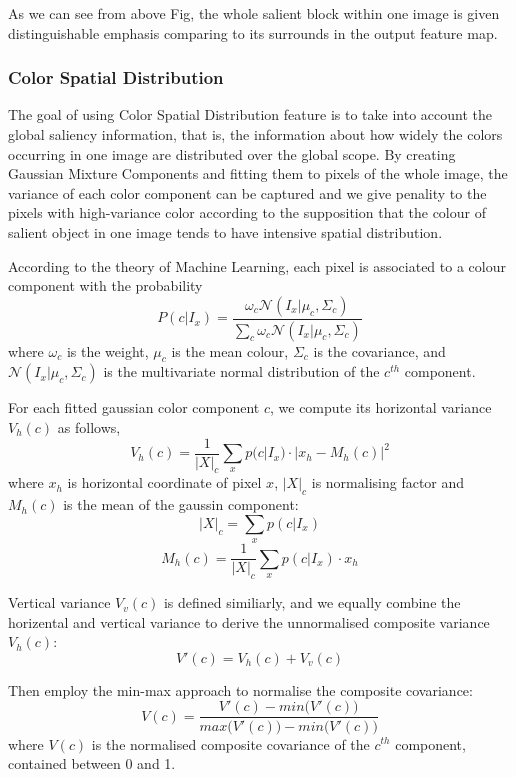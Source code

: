 \documentclass[10pt,twocolumn,letterpaper]{article}
\newcommand{\SUM}{\sum\limits}
\begin{document}
    As we can see from above Fig, the whole salient block within one image is given distinguishable 
    emphasis comparing to its surrounds in the output feature map. 



\subsubsection{Color Spatial Distribution}
    The goal of using Color Spatial Distribution feature is to take into account the global saliency information, 
    that is, the information about how widely the colors occurring in one image are distributed over the global scope.
    By creating Gaussian Mixture Components and fitting them to pixels of the whole image, the
    variance of each color component can be captured and we give penality to the pixels with high-variance 
    color according to the supposition that the colour of salient object in one image tends to have 
    intensive spatial distribution.
    
    According to the theory of Machine Learning, each pixel is associated to a colour component with the probability
    $$
    P(c|I_x) = \frac{\omega_c\mathcal{N}(I_x|\mu_c,\Sigma_c)}{\SUM_c \omega_c \mathcal{N}(I_x|\mu_c,\Sigma_c)}
    $$
    where $\omega_c$ is the weight, $\mu_c$ is the mean colour, $\Sigma_c$ is the covariance, and $\mathcal N(I_x|\mu_c,\Sigma_c)$ is the multivariate normal distribution of the $c^{th}$ component.

    For each fitted gaussian color component $c$, we compute its horizontal variance $V_{h}(c)$ as follows,
    $$
    V_{h}(c) = \frac{1}{|X|_{c}} \sum_{x} p (c|I_{x}) \cdot | x_{h} - M_{h}(c) |^{2}
    $$
    where $x_h$ is horizontal coordinate of pixel $x$, $|X|_c$ is normalising factor 
    and $M_h (c)$ is the mean of the gaussin component:
    $$
    |X|_c = \sum_x p(c|I_x)
    $$
    $$
    M_h (c) = \frac{1}{|X|_c} \sum_{x} p(c|I_x) \cdot x_h
    $$

    Vertical variance $V_{v}(c)$ is defined similiarly, and we equally combine the horizental and vertical variance to derive the unnormalised composite variance $V_h (c)$: 
    $$
    V' (c) = V_h (c) + V_v (c) 
    $$

    Then employ the min-max approach to normalise the composite covariance:
    $$
    V (c) = \frac{V'(c) - min \big(V'(c)\big) }{max \big(V'(c)\big) - min \big(V'(c)\big)}  
    $$
    where $V(c)$ is the normalised composite covariance of the $c^{th}$ component, contained between 0 and 1.
\end{document}
